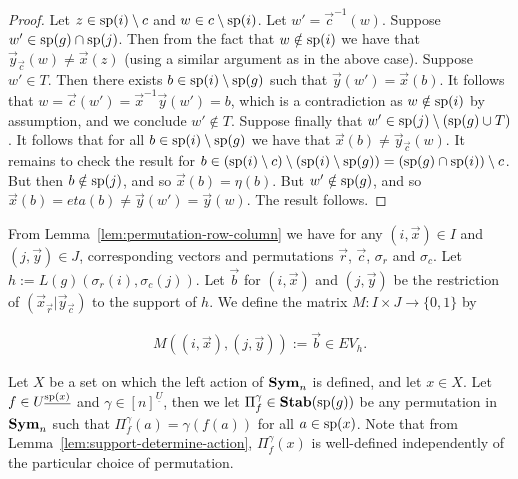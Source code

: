 \documentclass[../paper.tex]{subfiles}
\begin{document}
\begin{proof}
	Let $z \in \text{sp}(i) \setminus c$ and $w \in c \setminus \text{sp}(i)$. Let $w' =
	\vec{c}^{-1}(w)$. Suppose $w' \in \text{sp}(g) \cap \text{sp}(j)$. Then from the
	fact that $w \notin \text{sp}(i)$ we have that $\vec{y}_{\vec{c}}(w) \neq
	\vec{x}(z)$ (using a similar argument as in the above case). Suppose $w' \in
	T$. Then there exists $b \in \text{sp}(i) \setminus \text{sp}(g)$ such that
	$\vec{y}(w') = \vec{x}(b)$. It follows that $w = \vec{c}(w') =
	\vec{x}^{-1}\vec{y} (w') = b$, which is a contradiction as $w \notin
	\text{sp}(i)$ by assumption, and we conclude $w' \notin T$. Suppose finally that
	$w' \in \text{sp}(j) \setminus (\text{sp}(g) \cup T)$. It follows that for all $b
	\in \text{sp}(i) \setminus \text{sp}(g)$ we have that $\vec{x}(b) \neq
	\vec{y}_{\vec{c}}(w)$. It remains to check the result for $b \in (\text{sp}(i)
	\setminus c) \setminus (\text{sp}(i) \setminus \text{sp}(g)) = (\text{sp}(g) \cap
	\text{sp}(i)) \setminus c$. But then $b \notin \text{sp}(j)$, and so $\vec{x}(b) =
	\eta (b)$. But $w' \notin \text{sp}(g)$, and so $\vec{x}(b) = eta(b) \neq
	\vec{y}(w') = \vec{y}(w)$. The result follows.
\end{proof}

From Lemma~\ref{lem:permutation-row-column} we have for any $(i, \vec{x}) \in I$
and $(j, \vec{y}) \in J$, corresponding vectors and permutations $\vec{r}$,
$\vec{c}$, $\sigma_r$ and $\sigma_c$. Let $h := L(g)(\sigma_r(i), \sigma_c
(j))$. Let $\vec{b}$ for $(i, \vec{x})$ and $(j, \vec{y})$ be the restriction of
$(\vec{x}_{\vec{r}} \vert \vec{y}_{\vec{c}})$ to the support of $h$. We define
the matrix $M : I \times J \rightarrow \{0,1\}$ by

\begin{align*}
	M((i , \vec{x}), (j, \vec{y})) := \vec{b} \in EV_h. 
\end{align*}



Let $X$ be a set on which the left action of $\text{\textbf{Sym}}_n$ is defined, and let $x \in
X$. Let $f \in U^{\underline{\text{sp}(x)}}$ and $\gamma\in [n]^{\underline{U}}$,
then we let $\Pi^{\gamma}_{f} \in \text{\textbf{Stab}} (\text{sp} (g))$ be any permutation in $\text{\textbf{Sym}}_n$
such that $\Pi^{\gamma}_f (a) = \gamma (f(a))$ for all $a \in \text{sp}(x)$. Note
that from Lemma~\ref{lem:support-determine-action}, $\Pi^{\gamma}_f(x)$ is
well-defined independently of the particular choice of permutation.
\end{document}
